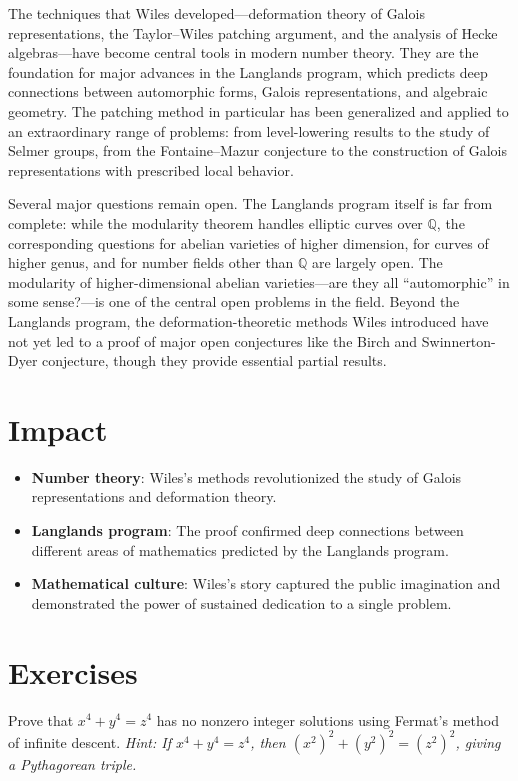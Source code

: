 The techniques that Wiles developed---deformation theory of Galois representations, the Taylor--Wiles patching argument, and the analysis of Hecke algebras---have become central tools in modern number theory. They are the foundation for major advances in the Langlands program, which predicts deep connections between automorphic forms, Galois representations, and algebraic geometry. The patching method in particular has been generalized and applied to an extraordinary range of problems: from level-lowering results to the study of Selmer groups, from the Fontaine--Mazur conjecture to the construction of Galois representations with prescribed local behavior.

Several major questions remain open. The Langlands program itself is far from complete: while the modularity theorem handles elliptic curves over $\mathbb{Q}$, the corresponding questions for abelian varieties of higher dimension, for curves of higher genus, and for number fields other than $\mathbb{Q}$ are largely open. The modularity of higher-dimensional abelian varieties---are they all ``automorphic'' in some sense?---is one of the central open problems in the field. Beyond the Langlands program, the deformation-theoretic methods Wiles introduced have not yet led to a proof of major open conjectures like the Birch and Swinnerton-Dyer conjecture, though they provide essential partial results.

\section{Impact}

\begin{itemize}
\item \textbf{Number theory}: Wiles's methods revolutionized the study of Galois representations and deformation theory.
\item \textbf{Langlands program}: The proof confirmed deep connections between different areas of mathematics predicted by the Langlands program.
\item \textbf{Mathematical culture}: Wiles's story captured the public imagination and demonstrated the power of sustained dedication to a single problem.
\end{itemize}

\section{Exercises}

\begin{exercise}[Basic]
Prove that $x^4 + y^4 = z^4$ has no nonzero integer solutions using Fermat's method of infinite descent. \emph{Hint: If $x^4 + y^4 = z^4$, then $(x^2)^2 + (y^2)^2 = (z^2)^2$, giving a Pythagorean triple.}
\end{exercise}

